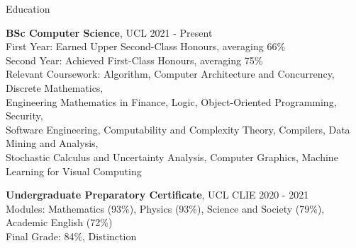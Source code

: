 \documentclass{resume} %
\begin{document}
\begin{rSection}{Education}

{\bf BSc Computer Science}, UCL \hfill {2021 - Present}\\
First Year: Earned Upper Second-Class Honours, averaging 66\% \\
Second Year: Achieved First-Class Honours, averaging 75\% \\
Relevant Coursework: Algorithm, Computer Architecture and Concurrency, Discrete Mathematics, \\
Engineering Mathematics in Finance, Logic, Object-Oriented Programming, Security, \\
Software Engineering, Computability and Complexity Theory, Compilers, Data Mining and Analysis, \\
Stochastic Calculus and Uncertainty Analysis, Computer Graphics, Machine Learning for Visual Computing

{\bf Undergraduate Preparatory Certificate}, UCL CLIE \hfill {2020 - 2021}\\
Modules: Mathematics (93\%), Physics (93\%), Science and Society (79\%), Academic English (72\%)\\
Final Grade: 84\%, Distinction

\end{rSection}
\end{document}
